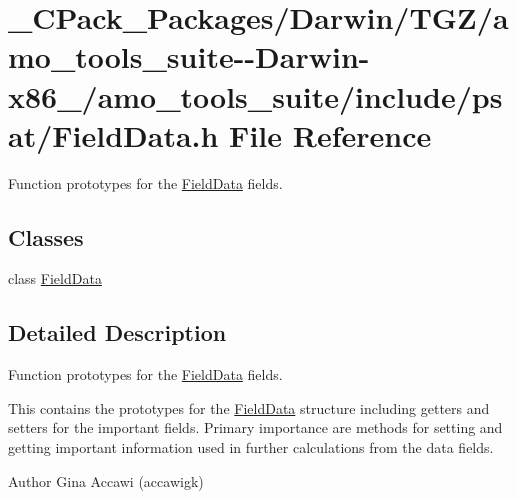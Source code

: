 \hypertarget{___c_pack___packages_2_darwin_2_t_g_z_2amo__tools__suite--_darwin-x86__64_2amo__tools__suite_2include_2psat_2_field_data_8h}{}\section{\+\_\+\+C\+Pack\+\_\+\+Packages/\+Darwin/\+T\+G\+Z/amo\+\_\+tools\+\_\+suite-\/-\/\+Darwin-\/x86\+\_/amo\+\_\+tools\+\_\+suite/include/psat/\+Field\+Data.h File Reference}
\label{___c_pack___packages_2_darwin_2_t_g_z_2amo__tools__suite--_darwin-x86__64_2amo__tools__suite_2include_2psat_2_field_data_8h}


Function prototypes for the \hyperlink{class_field_data}{Field\+Data} fields.  


\subsection*{Classes}
\begin{DoxyCompactItemize}
\item 
class \hyperlink{class_field_data}{Field\+Data}
\end{DoxyCompactItemize}


\subsection{Detailed Description}
Function prototypes for the \hyperlink{class_field_data}{Field\+Data} fields. 

This contains the prototypes for the \hyperlink{class_field_data}{Field\+Data} structure including getters and setters for the important fields. Primary importance are methods for setting and getting important information used in further calculations from the data fields.

\begin{DoxyAuthor}{Author}
Gina Accawi (accawigk) 
\end{DoxyAuthor}

